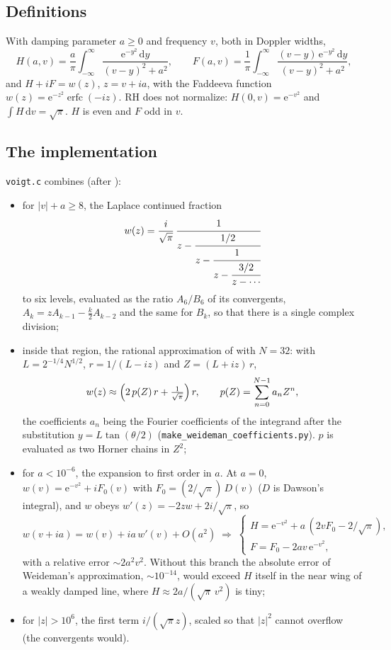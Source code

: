 \documentclass[11pt,a4paper]{article}
\newcommand{\code}[1]{\texttt{#1}}
\newcommand{\dd}{\mathrm{d}}
\newcommand{\e}{\mathrm{e}}
\begin{document}
\subsection{Definitions}
With damping parameter $a\ge 0$ and frequency $v$, both in Doppler
widths,
\begin{equation}
H(a,v) = \frac{a}{\pi}\int_{-\infty}^{\infty}
  \frac{\e^{-y^2}\,\dd y}{(v-y)^2+a^2},\qquad
F(a,v) = \frac{1}{\pi}\int_{-\infty}^{\infty}
  \frac{(v-y)\,\e^{-y^2}\,\dd y}{(v-y)^2+a^2},
\end{equation}
and $H + iF = w(z)$, $z = v + ia$, with the Faddeeva function
$w(z) = \e^{-z^2}\operatorname{erfc}(-iz)$. RH does not normalize:
$H(0,v) = \e^{-v^2}$ and $\int H\,\dd v = \sqrt\pi$. $H$ is even and $F$
odd in $v$.

\subsection{The implementation}
\code{voigt.c} combines (after \citealt{2018JQSRT.213...13S}):
\begin{itemize}
\item for $|v|+a\ge 8$, the Laplace continued fraction
\begin{equation}
w(z) = \frac{i}{\sqrt\pi}\,\cfrac{1}{z-\cfrac{1/2}{z-\cfrac{1}{z-\cfrac{3/2}{z-\cdots}}}}
\end{equation}
  to six levels, evaluated as the ratio $A_6/B_6$ of its convergents,
  $A_k = zA_{k-1}-\tfrac{k}{2}A_{k-2}$ and the same for $B_k$, so that
  there is a single complex division;
\item inside that region, the rational approximation of \citet{10.1137/0731077} with
  $N=32$: with $L = 2^{-1/4}N^{1/2}$, $r = 1/(L-iz)$ and
  $Z = (L+iz)\,r$,
  \begin{equation}
  w(z) \approx \Bigl(2\,p(Z)\,r + \tfrac{1}{\sqrt\pi}\Bigr)\,r,\qquad
  p(Z) = \sum_{n=0}^{N-1} a_n Z^n,
  \end{equation}
  the coefficients $a_n$ being the Fourier coefficients of the integrand
  after the substitution $y = L\tan(\theta/2)$
  (\code{make\_weideman\_coefficients.py}). $p$ is evaluated as two
  Horner chains in $Z^2$;
\item for $a<10^{-6}$, the expansion to first order in $a$. At $a=0$,
  $w(v) = \e^{-v^2} + iF_0(v)$ with $F_0 = (2/\sqrt\pi)\,D(v)$ ($D$ is
  Dawson's integral), and $w$ obeys $w'(z) = -2zw + 2i/\sqrt\pi$, so
  \begin{equation}
  w(v+ia) = w(v) + ia\,w'(v) + O(a^2)
  \;\Rightarrow\;
  \begin{cases}
  H = \e^{-v^2} + a\,(2vF_0 - 2/\sqrt\pi),\\
  F = F_0 - 2av\,\e^{-v^2},
  \end{cases}
  \end{equation}
  with a relative error $\sim 2a^2v^2$. Without this branch the absolute
  error of Weideman's approximation, $\sim10^{-14}$, would exceed $H$
  itself in the near wing of a weakly damped line, where $H\approx
  2a/(\sqrt\pi\,v^2)$ is tiny;
\item for $|z|>10^6$, the first term $i/(\sqrt\pi z)$, scaled so that
  $|z|^2$ cannot overflow (the convergents would).
\end{itemize}
\end{document}
